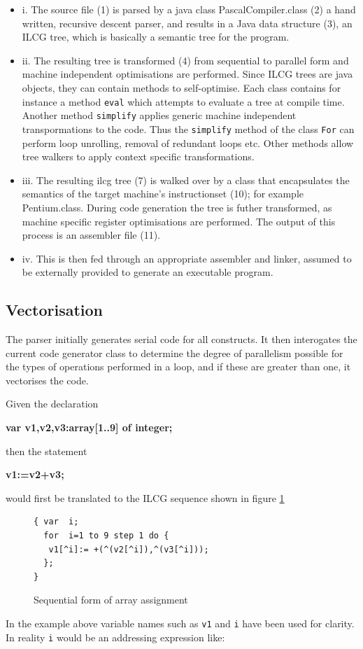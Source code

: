 \begin{itemize}
\item i. The source file (1) is parsed by a java class PascalCompiler.class
(2) a hand written, recursive descent parser\cite{Watt}, and results
in a Java data structure (3), an ILCG tree, which is basically a semantic
tree for the program. 
\item ii. The resulting tree is transformed (4) from sequential to parallel
form and machine independent optimisations are performed. Since ILCG
trees are java objects, they can contain methods to self-optimise.
Each class contains for instance a method \texttt{eval} which attempts
to evaluate a tree at compile time. Another method \texttt{simplify}
applies generic machine independent transpormations to the code. Thus
the \texttt{simplify} method of the class \texttt{For} can perform
loop unrolling, removal of redundant loops etc. Other methods allow
tree walkers to apply context specific transformations. 
\item iii. The resulting ilcg tree (7) is walked over by a class that encapsulates
the semantics of the target machine's instructionset (10); for example
Pentium.class. During code generation the tree is futher transformed,
as machine specific register optimisations are performed. The output
of this process is an assembler file (11). 
\item iv. This is then fed through an appropriate assembler and linker,
assumed to be externally provided to generate an executable program. 
\end{itemize}

\subsection{Vectorisation}

The parser initially generates serial code for all constructs. It
then interogates the current code generator class to determine the
degree of parallelism possible for the types of operations performed
in a loop, and if these are greater than one, it vectorises the code.

Given the declaration

\textbf{var v1,v2,v3:array{[}1..9{]} of integer;}

then the statement

\textbf{v1:=v2+v3;}

would first be translated to the ILCG sequence shown in figure \ref{seqf}%
\begin{figure}
\begin{verbatim}
{ var  i;
  for  i=1 to 9 step 1 do {
   v1[^i]:= +(^(v2[^i]),^(v3[^i]));
  };
}
\end{verbatim}


\caption{Sequential form of array assignment}

\label{seqf}
\end{figure}
 In the example above variable names such as \texttt{v1} and \texttt{i}
have been used for clarity. In reality \texttt{i} would be an addressing
expression like:

